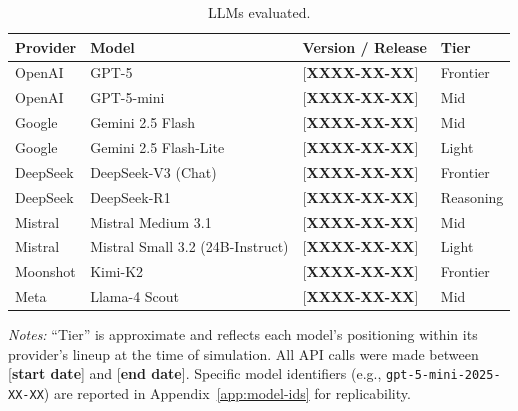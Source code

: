 
\begin{table}[h]
    \centering
    \caption{LLMs evaluated.}
    \begin{threeparttable}
    \begin{tabular}{llll}
        \toprule
        Provider & Model & Version / Release & Tier \\
        \midrule
        OpenAI    & GPT-5                     & [\textbf{XXXX-XX-XX}] & Frontier \\
        OpenAI    & GPT-5-mini                & [\textbf{XXXX-XX-XX}] & Mid \\
        Google    & Gemini 2.5 Flash          & [\textbf{XXXX-XX-XX}] & Mid \\
        Google    & Gemini 2.5 Flash-Lite     & [\textbf{XXXX-XX-XX}] & Light \\
        DeepSeek  & DeepSeek-V3 (Chat)        & [\textbf{XXXX-XX-XX}] & Frontier \\
        DeepSeek  & DeepSeek-R1               & [\textbf{XXXX-XX-XX}] & Reasoning \\
        Mistral   & Mistral Medium 3.1        & [\textbf{XXXX-XX-XX}] & Mid \\
        Mistral   & Mistral Small 3.2 (24B-Instruct) & [\textbf{XXXX-XX-XX}] & Light \\
        Moonshot  & Kimi-K2                   & [\textbf{XXXX-XX-XX}] & Frontier \\
        Meta      & Llama-4 Scout             & [\textbf{XXXX-XX-XX}] & Mid \\
        \bottomrule
    \end{tabular}
    \begin{tablenotes}\footnotesize
    \item \textit{Notes:} ``Tier'' is approximate and reflects each model's
    positioning within its provider's lineup at the time of simulation.
    All API calls were made between [\textbf{start date}] and
    [\textbf{end date}]. Specific model identifiers (e.g.,
    \texttt{gpt-5-mini-2025-XX-XX}) are reported in
    Appendix~\ref{app:model-ids} for replicability.
    \end{tablenotes}
    \end{threeparttable}
\end{table}